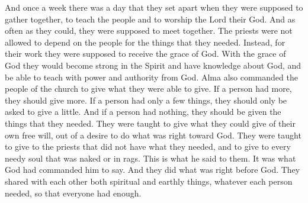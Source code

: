 And once a week there was a day that they set apart when they were supposed to gather together, to teach the people and to worship the Lord their God. And as often as they could, they were supposed to meet together.
\bverse \iffalse And the priests were not to depend upon the people for their support; but for their labor they were to receive the grace of God, that they might wax strong in the Spirit, having the knowledge of God, that they might teach with power and authority from God. \fi
The priests were not allowed to depend on the people for the things that they needed. Instead, for their work they were supposed to receive the grace of God. With the grace of God they would become strong in the Spirit and have knowledge about God, and be able to teach with power and authority from God.
\bverse \iffalse And again Alma commanded that the people of the church should impart of their substance, every one according to that which he had; if he have more abundantly he should impart more abundantly; and of him that had but little, but little should be required; and to him that had not should be given. \fi
Alma also commanded the people of the church to give what they were able to give. If a person had more, they should give more. If a person had only a few things, they should only be asked to give a little. And if a person had nothing, they should be given the things that they needed.
\bverse \iffalse And thus they should impart of their substance of their own free will and good desires towards God, and to those priests that stood in need, yea, and to every needy, naked soul. \fi
They were taught to give what they could give of their own free will, out of a desire to do what was right toward God. They were taught to give to the priests that did not have what they needed, and to give to every needy soul that was naked or in rags.
\bverse \iffalse And this he said unto them, having been commanded of God; and they did walk uprightly before God, imparting to one another both temporally and spiritually according to their needs and their wants. \fi
This is what he said to them. It was what God had commanded him to say. And they did what was right before God. They shared with each other both spiritual and earthly things, whatever each person needed, so that everyone had enough.
\bverse \iffalse And now it came to pass that all this was done in Mormon, yea, by the waters of Mormon, in the forest that was near the waters of Mormon; yea, the place of Mormon, the waters of Mormon, the forest of Mormon, how beautiful are they to the eyes of them who there came to the knowledge of their Redeemer; yea, and how blessed are they, for they shall sing to his praise forever. \fi

